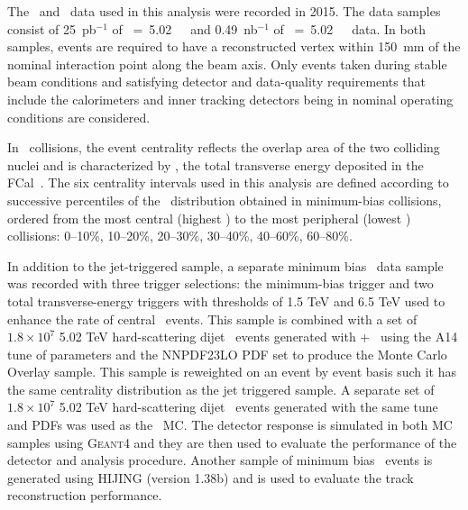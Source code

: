
The \PbPb\ and \pp\ data used in this analysis were recorded in 2015.
 The data samples consist of 25~pb$^{-1}$ of \sqrts~=~5.02~\TeV\ \pp\ and 0.49~nb$^{-1}$ of \sqrtsnn~=~5.02~\TeV\
\pbpb\ data. In both samples, events are required to have a reconstructed vertex
within 150~mm of the nominal interaction point along the beam axis.
Only events taken during stable beam conditions and satisfying detector and data-quality requirements that include the calorimeters and inner tracking detectors being in nominal operating conditions are considered. 



In \PbPb\ collisions, the event centrality reflects the overlap area of the two colliding nuclei and is characterized by \ETfcal, the total transverse energy deposited in the 
FCal~\cite{Aaboud:2017tql}. The six centrality intervals used in this analysis are defined according to successive percentiles of the \ETfcal\ distribution obtained in minimum-bias collisions, ordered from the most central (highest \ETfcal) to the most peripheral (lowest \ETfcal) collisions: 0--10\%, 10--20\%, 20--30\%, 30--40\%, 40--60\%, 60--80\%. 

In addition to the jet-triggered sample, a separate minimum bias \PbPb\ data sample was recorded with three trigger selections: the minimum-bias trigger and two total transverse-energy triggers with thresholds of 1.5 TeV and 6.5 TeV used to enhance the rate of central \pbpb\ events. This sample is combined with a set of $1.8\times10^7$ 5.02 TeV hard-scattering dijet \pp\ events generated with \powheg{}+\pythiaeight\ \cite{Nason:2004rx,Sjostrand:2014zea} using the A14 tune of parameters \cite{ATLAS2014021} and the NNPDF23LO PDF set \cite{Ball:2012cx} to produce the Monte Carlo Overlay sample. This sample is reweighted on an event by event basis such it has the same centrality distribution as the jet triggered sample.
A separate set of $1.8\times10^7$ 5.02 TeV hard-scattering dijet \pp\ events generated with the same tune and PDFs was used as the \pp\ MC. The detector response is simulated in both MC samples using \textsc{Geant4} \cite{Agostinelli:2002hh,Aad:2010ah} and they are then used to evaluate the performance of the detector and analysis procedure. Another sample of minimum bias \pbpb\ events is generated using HIJING (version 1.38b) \cite{Aad:2010ah} and is used to evaluate the track reconstruction performance.


